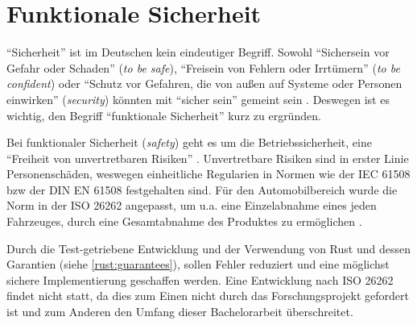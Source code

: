 


\section{Funktionale Sicherheit}
\label{com:safety}

\enquote{Sicherheit} ist im Deutschen kein eindeutiger Begriff.
Sowohl \enquote{Sichersein vor Gefahr oder Schaden} (\textit{to be safe}), \enquote{Freisein von Fehlern oder Irrtümern} (\textit{to be confident}) oder \enquote{Schutz vor Gefahren, die von außen auf Systeme oder Personen einwirken} (\textit{security}) könnten mit \enquote{sicher sein} gemeint sein \cite[5-6]{safety}.
Deswegen ist es wichtig, den Begriff \enquote{funktionale Sicherheit} kurz zu ergründen.

Bei funktionaler Sicherheit (\textit{safety}) geht es um die Betriebssicherheit, eine \enquote{Freiheit von unvertretbaren Risiken} \cite[6]{safety}.
Unvertretbare Risiken sind in erster Linie Personenschäden, weswegen einheitliche Regularien in Normen wie der IEC 61508 bzw der DIN EN 61508 festgehalten sind.
Für den Automobilbereich wurde die Norm in der ISO 26262 angepasst, um u.a. eine Einzelabnahme eines jeden Fahrzeuges, durch eine Gesamtabnahme des Produktes zu ermöglichen \cite[14]{safety}.

Durch die Test-getriebene Entwicklung und der Verwendung von Rust und dessen Garantien (siehe \autoref{rust:guarantees}), sollen Fehler reduziert und eine möglichst sichere Implementierung geschaffen werden.
Eine Entwicklung nach ISO 26262 findet nicht statt, da dies zum Einen nicht durch das Forschungsprojekt gefordert ist und zum Anderen den Umfang dieser Bachelorarbeit überschreitet.



